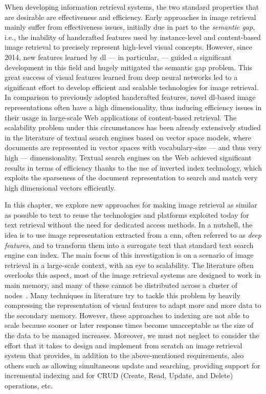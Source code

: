 When developing information retrieval systems, the two standard properties that are desirable are effectiveness and efficiency.
Early approaches in image retrieval mainly suffer from effectiveness issues, initially due in part to the \emph{semantic gap}, i.e., the inability of handcrafted features used by instance-level and content-based image retrieval to precisely represent high-level visual concepts.
However, since 2014, new features learned by \acrlong{dl} --- in particular,  --- guided a significant development in this field and hugely mitigated the semantic gap problem.
This great success of visual features learned from deep neural networks led to a significant effort to develop efficient and scalable technologies for image retrieval.
In comparison to previously adopted handcrafted features, novel \gls{dl}-based image representations often have a high dimensionality, thus inducing efficiency issues in their usage in large-scale Web applications of content-based retrieval.
The scalability problem under this circumstances has been already extensively studied in the literature of textual search engines based on vector space models, where documents are represented in vector spaces with vocabulary-size --- and thus very high --- dimensionality.
Textual search engines on the Web achieved significant results in terms of efficiency thanks to the use of inverted index technology, which exploits the sparseness of the document representation to search and match very high dimensional vectors efficiently.

In this chapter, we explore new approaches for making image retrieval as similar as possible to text to reuse the technologies and platforms exploited today for text retrieval without the need for dedicated access methods.
In a nutshell, the idea is to use image representation extracted from a \gls{cnn}, often referred to as \emph{deep features}, and to transform them into a surrogate text that standard text search engine can index.
The main focus of this investigation is on a scenario of image retrieval in a large-scale context, with an eye to scalability.
The literature often overlooks this aspect, most of the image retrieval systems are designed to work in main memory, and many of these cannot be distributed across a cluster of nodes~\cite{navarro2016new}.
Many techniques in literature try to tackle this problem by heavily compressing the representation of visual features to adapt more and more data to the secondary memory.
However, these approaches to indexing are not able to scale because sooner or later response times become unacceptable as the size of the data to be managed increases.
Moreover, we must not neglect to consider the effort that it takes to design and implement from scratch an image retrieval system that provides, in addition to the above-mentioned requirements, also others such as allowing simultaneous update and searching, providing support for incremental indexing and for CRUD (Create, Read, Update, and Delete) operations, etc.

